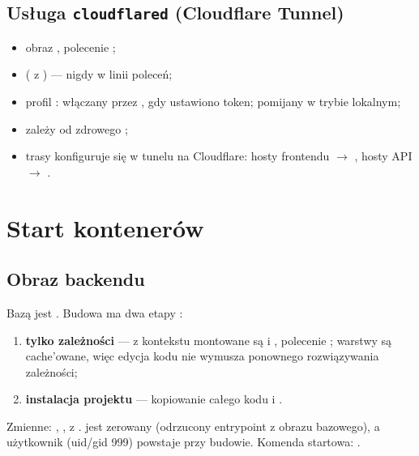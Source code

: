 \subsection{Usługa \texttt{cloudflared} (Cloudflare Tunnel)}

\begin{itemize}
  \item obraz , polecenie ;
  \item {} ( z ) --- nigdy w linii poleceń;
  \item profil : włączany przez , gdy ustawiono token; pomijany w trybie lokalnym;
  \item zależy od zdrowego ;
  \item trasy konfiguruje się w tunelu na Cloudflare: hosty frontendu $\rightarrow$ , hosty API $\rightarrow$ .
\end{itemize}

\section{Start kontenerów}
\label{sec:op-start-kontenerow}

\subsection{Obraz backendu}

Bazą jest . Budowa ma dwa etapy
:

\begin{enumerate}
  \item \textbf{tylko zależności} --- z kontekstu montowane są  i , polecenie ; warstwy są cache'owane, więc edycja kodu nie wymusza ponownego rozwiązywania zależności;
  \item \textbf{instalacja projektu} --- kopiowanie całego kodu i .
\end{enumerate}

Zmienne: , ,  z
.  jest zerowany (odrzucony entrypoint 
z obrazu bazowego), a użytkownik  (uid/gid 999) powstaje przy
budowie. Komenda startowa: .

